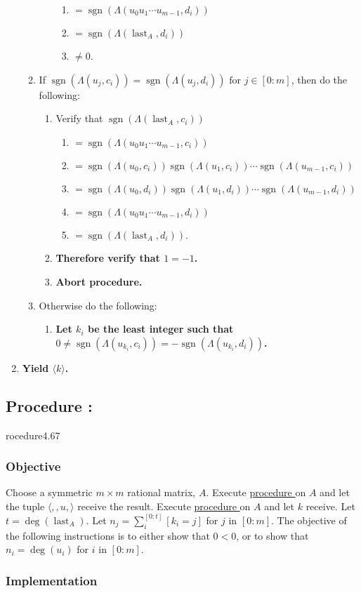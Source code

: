 \documentclass{article}
\DeclareMathOperator{\sgn}{sgn}
\DeclareMathOperator{\last}{last}
\newcommand{\for}{\text{ for }}
\newcounter{procedure}[part]
\newcommand{\procedure}[1]{\subsection*{Procedure \thepart:\theprocedure}\label{sec:procedure #1}\global\expandafter\edef\csname procedure#1\endcsname{\thepart:\theprocedure}\addtocounter{procedure}{1}}
\newcommand{\objective}{\subsubsection*{Objective}}
\newcommand{\implementation}{\subsubsection*{Implementation}}
\newcommand{\procedurehr}[1]{\hyperref[sec:procedure #1]{procedure \expandafter\csname procedure#1\endcsname}}
\begin{document}
\begin{multicols}{2}
\begin{enumerate}
\begin{enumerate}
\begin{enumerate}
\begin{enumerate}
								\item $=\sgn(\Lambda(u_0u_1\cdots u_{m-1},d_i))$
								\item $=\sgn(\Lambda(\last_A,d_i))$
								\item $\ne 0$.
							\end{enumerate}
						\end{enumerate}
						\item If $\sgn(\Lambda(u_j,c_i))=\sgn(\Lambda(u_j,d_i))\for j\in[0:m]$, then do the following:
						\begin{enumerate}
							\item Verify that $\sgn(\Lambda(\last_A,c_i))$
							\begin{enumerate}
								\item $=\sgn(\Lambda(u_0u_1\cdots u_{m-1},c_i))$
								\item $=\sgn(\Lambda(u_0,c_i))\sgn(\Lambda(u_1,c_i))\cdots\sgn(\Lambda(u_{m-1},c_i))$
								\item $=\sgn(\Lambda(u_0,d_i))\sgn(\Lambda(u_1,d_i))\cdots\sgn(\Lambda(u_{m-1},d_i))$
								\item $=\sgn(\Lambda(u_0u_1\cdots u_{m-1},d_i))$
								\item $=\sgn(\Lambda(\last_A,d_i))$.
							\end{enumerate}
							\item \textbf{Therefore verify that $1=-1$.}
							\item \textbf{Abort procedure.}
						\end{enumerate}
						\item Otherwise do the following:
						\begin{enumerate}
							\item \textbf{Let $k_i$ be the least integer such that $0\ne\sgn(\Lambda(u_{k_i},c_i))=-\sgn(\Lambda(u_{k_i},d_i))$.}
						\end{enumerate}
					\end{enumerate}
					\item \textbf{Yield $\langle k\rangle$.}
				\end{enumerate}
		\procedure{4.67}
			\objective
				Choose a symmetric $m\times m$ rational matrix, $A$. Execute \procedurehr{4.25} on $A$ and let the tuple $\langle,,u,\rangle$ receive the result. Execute \procedurehr{2.18} on $A$ and let $k$ receive. Let $t=\deg(\last_A)$. Let $n_j=\sum_i^{[0:t]} [k_i=j]$ for $j$ in $[0:m]$. The objective of the following instructions is to either show that $0<0$, or to show that $n_i=\deg(u_i)$ for $i$ in $[0:m]$.
			\implementation

\end{multicols}
\end{document}
